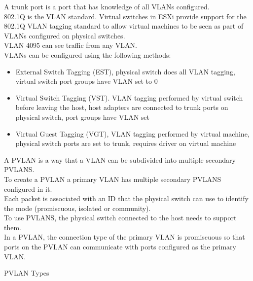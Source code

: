 A trunk port is a port that has knowledge of all VLANs configured.\\

802.1Q is the VLAN standard. Virtual switches in ESXi provide support for the
802.1Q VLAN tagging standard to allow virtual machines to be seen as part of
VLANs configured on physical switches.\\

VLAN 4095 can see traffic from any VLAN.\\

VLANs can be configured using the following methods:

\begin{itemize}

\item External Switch Tagging (EST), physical switch does all VLAN tagging,
virtual switch port groups have VLAN set to 0

\item Virtual Switch Tagging (VST). VLAN tagging performed by virtual switch
before leaving the host, host adapters are connected to trunk ports on
physical switch, port groups have VLAN set

\item Virtual Guest Tagging (VGT), VLAN tagging performed by virtual machine,
physical switch ports are set to trunk, requires driver on virtual machine

\end{itemize}

A PVLAN is a way that a VLAN can be subdivided into multiple secondary PVLANS.\\

To create a PVLAN a primary VLAN has multiple secondary PVLANS configured in
it.\\

Each packet is associated with an ID that the physical switch can use to
identify the mode (promiscuous, isolated or community).\\

To use PVLANS, the physical switch connected to the host needs to support them.\\

In a PVLAN, the connection type of the primary VLAN is promiscuous so that
ports on the PVLAN can communicate with ports configured as the primary VLAN.

PVLAN Types

